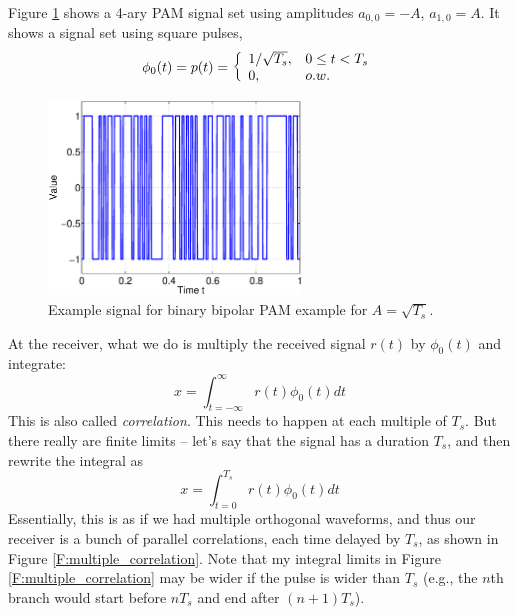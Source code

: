  Figure \ref{F:PAM-binary-square-pulse}
shows a 4-ary PAM signal set using amplitudes $a_{0,0}=-A$, $a_{1,0} = A$.
It shows a signal set using square pulses,
\[
  \phi_0(t) = p(t) = { \left\{\begin{array}{ll} {1/\sqrt{T_{s}}}, & {0 \le t < T_{s}} \\ 0, & o.w. \end{array}\right. }
\]
  \begin{figure}[htbp]
    \centerline{\includegraphics[width=0.6\textwidth]{../images/PAM-binary-square-pulse.eps} }
    \caption{Example signal for binary bipolar PAM example for $A = \sqrt{T_{s}}$.}
    \label{F:PAM-binary-square-pulse}
  \end{figure}


At the receiver, what we do is multiply the received signal $r(t)$ by $\phi_0(t)$ and integrate:
\[
 x = \int_{t=-\infty}^\infty r(t) \phi_0(t) dt
\]
This is also called \emph{correlation}. This needs to happen at each multiple of $T_s$. 
But there really are finite limits -- let's say that the signal has
a duration $T_s$, and then rewrite the integral as
\begin{equation} \label{E:Correlation}
 x = \int_{t=0}^{T_s} r(t) \phi_0(t) dt
\end{equation}
Essentially, this is as if we had multiple orthogonal waveforms, and thus our receiver is a bunch of parallel correlations, each time delayed by $T_s$, as shown in Figure \ref{F:multiple_correlation}.  Note that my integral limits in Figure \ref{F:multiple_correlation} may be wider if the pulse is wider than $T_s$ (e.g., the $n$th branch would start before $nT_s$ and end after $(n+1)T_s$).

